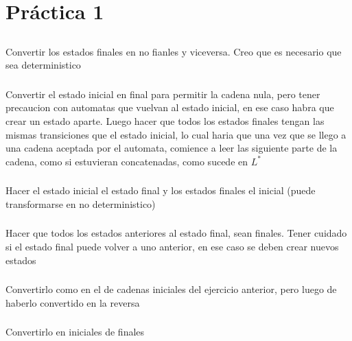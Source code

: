 \section{Práctica 1}

\setcounter{subsection}{3}
\subsection{}
\subsubsection{}
Convertir los estados finales en no fianles y viceversa. Creo que es necesario que sea deterministico

\subsubsection{}
Convertir el estado inicial en final para permitir la cadena nula, pero tener precaucion con automatas que vuelvan al estado inicial, en ese caso habra que crear un estado aparte. Luego hacer que todos los estados finales tengan las mismas transiciones que el estado inicial, lo cual haria que una vez que se llego a una cadena aceptada por el automata, comience a leer las siguiente parte de la cadena, como si estuvieran concatenadas, como sucede en $L^*$

\subsubsection{}
Hacer el estado inicial el estado final y los estados finales el inicial (puede transformarse en no deterministico)

\subsubsection{}
Hacer que todos los estados anteriores al estado final, sean finales. Tener cuidado si el estado final puede volver a uno anterior, en ese caso se deben crear nuevos estados

\subsubsection{}
Convertirlo como en el de cadenas iniciales del ejercicio anterior, pero luego de haberlo convertido en la reversa

\subsubsection{}
Convertirlo en iniciales de finales

